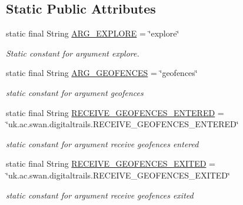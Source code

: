 \subsection*{Static Public Attributes}
\begin{DoxyCompactItemize}
\item 
static final String \hyperlink{classuk_1_1ac_1_1swan_1_1digitaltrails_1_1activities_1_1_map_activity_ac86be09c3bd3d33b4c0a99843e6ffecb}{A\+R\+G\+\_\+\+E\+X\+P\+L\+O\+R\+E} = \char`\"{}explore\char`\"{}
\begin{DoxyCompactList}\small\item\em Static constant for argument explore. \end{DoxyCompactList}\item 
static final String \hyperlink{classuk_1_1ac_1_1swan_1_1digitaltrails_1_1activities_1_1_map_activity_af83f73ddb139f99dbdf40d4849b13bf9}{A\+R\+G\+\_\+\+G\+E\+O\+F\+E\+N\+C\+E\+S} = \char`\"{}geofences\char`\"{}
\begin{DoxyCompactList}\small\item\em static constant for argument geofences \end{DoxyCompactList}\item 
static final String \hyperlink{classuk_1_1ac_1_1swan_1_1digitaltrails_1_1activities_1_1_map_activity_a7f2056604f7a13b22f2a9e5328448fba}{R\+E\+C\+E\+I\+V\+E\+\_\+\+G\+E\+O\+F\+E\+N\+C\+E\+S\+\_\+\+E\+N\+T\+E\+R\+E\+D} = \char`\"{}uk.\+ac.\+swan.\+digitaltrails.\+R\+E\+C\+E\+I\+V\+E\+\_\+\+G\+E\+O\+F\+E\+N\+C\+E\+S\+\_\+\+E\+N\+T\+E\+R\+E\+D\char`\"{}
\begin{DoxyCompactList}\small\item\em static constant for argument receive geofences entered \end{DoxyCompactList}\item 
static final String \hyperlink{classuk_1_1ac_1_1swan_1_1digitaltrails_1_1activities_1_1_map_activity_a8e2d03d80668ec761b99a7e48063327d}{R\+E\+C\+E\+I\+V\+E\+\_\+\+G\+E\+O\+F\+E\+N\+C\+E\+S\+\_\+\+E\+X\+I\+T\+E\+D} = \char`\"{}uk.\+ac.\+swan.\+digitaltrails.\+R\+E\+C\+E\+I\+V\+E\+\_\+\+G\+E\+O\+F\+E\+N\+C\+E\+S\+\_\+\+E\+X\+I\+T\+E\+D\char`\"{}
\begin{DoxyCompactList}\small\item\em static constant for argument receive geofences exited \end{DoxyCompactList}\end{DoxyCompactItemize}
